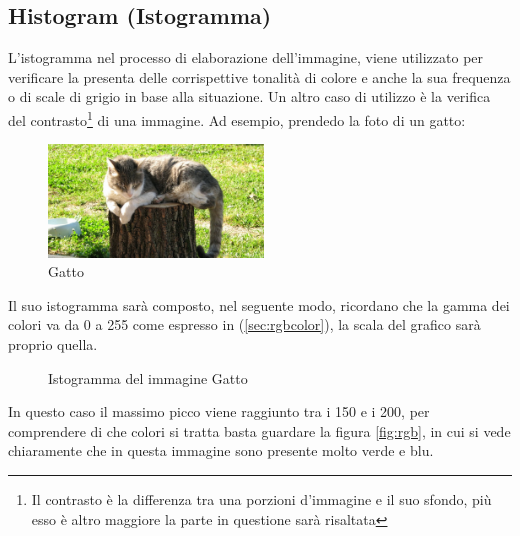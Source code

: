 \documentclass{report}
\begin{document}
\subsection{Histogram (Istogramma)}
\label{sec:histogram}
L'istogramma nel processo di elaborazione dell'immagine, viene utilizzato
per verificare la presenta delle corrispettive tonalità di colore e
anche la sua frequenza o di scale di grigio in base alla situazione.
Un altro caso di utilizzo è la verifica del contrasto\footnote{Il
  contrasto è la differenza tra una porzioni d'immagine e il suo
sfondo, più esso è altro maggiore la parte in questione sarà risaltata}
di una immagine. Ad esempio, prendedo la foto di un gatto:
\begin{figure}[ht!]
  \centering
  \includegraphics[height=3cm]{img/gatto.jpg}
  \caption{Gatto}
  \label{fig:gatto}
\end{figure}

Il suo istogramma sarà composto, nel seguente modo, ricordano che la
gamma dei colori va da 0 a 255 come espresso in (\ref{sec:rgbcolor}),
la scala del grafico sarà proprio quella.
\clearpage
\begin{figure}[ht!]
  \centering
  \resizebox{15cm}{!}{
  }
  \caption{Istogramma del immagine Gatto}
  \label{fig:gatto}
\end{figure}

In questo caso il massimo picco viene raggiunto tra i 150 e i 200, per
comprendere di che colori si tratta basta guardare la figura
\ref{fig:rgb}, in cui si vede chiaramente che in questa immagine sono
presente molto verde e blu.
\end{document}

